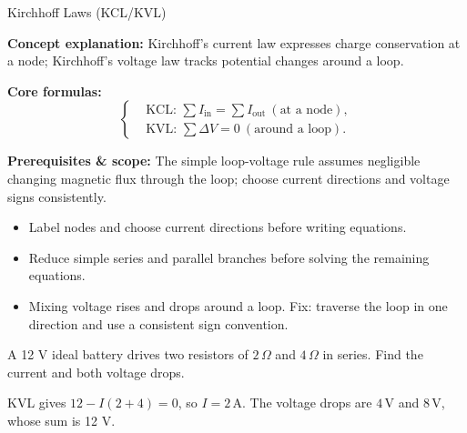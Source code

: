 \begin{KnowledgePoint}{Kirchhoff Laws (KCL/KVL) \Core}
  \KPFormulas
  \begin{formulabox}
  \textbf{Concept explanation:} Kirchhoff's current law expresses charge conservation at a node; Kirchhoff's voltage law tracks potential changes around a loop.

  \textbf{Core formulas:}
  \[
  \left\{\begin{aligned}
    &\text{KCL: } \sum I_{\text{in}}=\sum I_{\text{out}}\ (\text{at a node}),\\
    &\text{KVL: } \sum \Delta V=0\ (\text{around a loop}).
  \end{aligned}\right.
  \]

  \textbf{Prerequisites \& scope:} The simple loop-voltage rule assumes negligible changing magnetic flux through the loop; choose current directions and voltage signs consistently.
  \end{formulabox}

  \KPHeuristics
  \begin{heuristicsbox}
\begin{itemize}[leftmargin=*]
  \item Label nodes and choose current directions before writing equations.
  \item Reduce simple series and parallel branches before solving the remaining equations.
\end{itemize}
  \vspace{0.4em}
  \begin{itemize}[leftmargin=*]
    \item Mixing voltage rises and drops around a loop. Fix: traverse the loop in one direction and use a consistent sign convention.
  \end{itemize}
  \end{heuristicsbox}

  \KPProblems
  \begin{cheatproblem}
  A 12 V ideal battery drives two resistors of $2\,\Omega$ and $4\,\Omega$ in series. Find the current and both voltage drops.
  \begin{solutionbox}
  KVL gives $12-I(2+4)=0$, so $I=2\,\mathrm A$. The voltage drops are $4\,\mathrm V$ and $8\,\mathrm V$, whose sum is 12 V.
  \end{solutionbox}
  \end{cheatproblem}
\end{KnowledgePoint}

